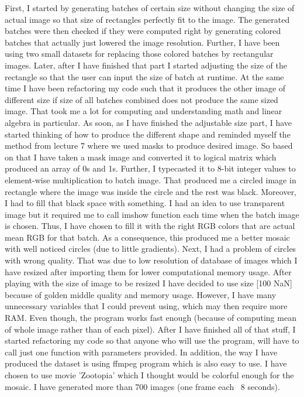 \documentclass{IEEEtran}
\begin{document}
First, I started by generating batches of certain size without changing the size of actual image so that size of rectangles perfectly fit to the image. The generated batches were then checked if they were computed right by generating colored batches that actually just lowered the image resolution. Further, I have been using two small datasets for replacing those colored batches by rectangular images. Later, after I have finished that part I started adjusting the size of the rectangle so that the user can input the size of batch at runtime. At the same time I have been refactoring my code such that it produces the other image of different size if size of all batches combined does not produce the same sized image. That took me a lot for computing and understanding math and linear algebra in particular. As soon, as I have finished the adjustable size part, I have started thinking of how to produce the different shape and reminded myself the method from lecture 7 where we used masks to produce desired image. So based on that I have taken a mask image and converted it to logical matrix which produced an array of 0s and 1s. Further, I typecasted it to 8-bit integer values to element-wise multiplication to batch image. That produced me a circled image in rectangle where the image was inside the circle and the rest was black. Moreover, I had to fill that black space with something. I had an idea to use transparent image but it required me to call imshow function each time when the batch image is chosen. Thus, I have chosen to fill it with the right RGB colors that are actual mean RGB for that batch. As a consequence, this produced me a better mosaic with well noticed circles (due to little gradients). Next, I had a problem of circles with wrong quality. That was due to low resolution of database of images which I have resized after importing them for lower computational memory usage. After playing with the size of image to be resized I have decided to use size [100 NaN] because of golden middle quality and memory usage. However, I have many unnecessary variables that I could prevent using, which may then require more RAM. Even though, the program works fast enough (because of computing mean of whole image rather than of each pixel). After I have finished all of that stuff, I started refactoring my code so that anyone who will use the program, will have to call just one function with parameters provided.
In addition, the way I have produced the dataset is using ffmpeg program which is also easy to use. I have chosen to use movie 'Zootopia' which I thought would be colorful enough for the mosaic. I have generated more than 700 images (one frame each ~8 seconds).
\end{document}
